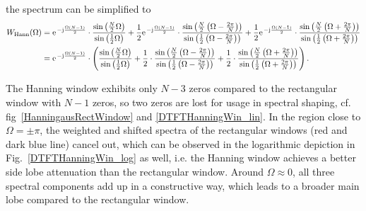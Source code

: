 \documentclass[11pt,a4paper,DIV=12]{scrartcl}
\begin{document}
%
the spectrum can be simplified to
%
\begin{align}
W_{\text{Hann}}(\Omega)&=\e^{-\im\frac{\Omega(N-1)}{2}}\cdot\frac{\sin\left(\frac{N}{2}\Omega\right)}{\sin\left(\frac{1}{2}\Omega\right)}+\frac{1}{2}\e^{-\im\frac{\Omega(N-1)}{2}}\cdot\frac{\sin\left(\frac{N}{2}\left(\Omega-\frac{2\pi}{N}\right)\right)}{\sin\left(\frac{1}{2}\left(\Omega-\frac{2\pi}{N}\right)\right)}+\frac{1}{2}\e^{-\im\frac{\Omega(N-1)}{2}}\cdot\frac{\sin\left(\frac{N}{2}\left(\Omega+\frac{2\pi}{N}\right)\right)}{\sin\left(\frac{1}{2}\left(\Omega+\frac{2\pi}{N}\right)\right)}\\
&=\e^{-\im\frac{\Omega(N-1)}{2}}\cdot\left(\frac{\sin\left(\frac{N}{2}\Omega\right)}{\sin\left(\frac{1}{2}\Omega\right)}+\frac{1}{2}\cdot\frac{\sin\left(\frac{N}{2}\left(\Omega-\frac{2\pi}{N}\right)\right)}{\sin\left(\frac{1}{2}\left(\Omega-\frac{2\pi}{N}\right)\right)}+\frac{1}{2}\cdot\frac{\sin\left(\frac{N}{2}\left(\Omega+\frac{2\pi}{N}\right)\right)}{\sin\left(\frac{1}{2}\left(\Omega+\frac{2\pi}{N}\right)\right)}\right).
\end{align}

The Hanning window exhibits only $N-3$ zeros compared to the rectangular window
with $N-1$ zeros, so two zeros are lost for usage in spectral shaping,
cf. fig~\ref{HanningausRectWindow} and \ref{DTFTHanningWin_lin}.
%
In the region close to $\Omega=\pm\pi$, the weighted and shifted spectra of
the rectangular windows (red and dark blue line) cancel out, which can be
observed in the logarithmic depiction in Fig.~\ref{DTFTHanningWin_log} as well,
i.e. the Hanning window achieves a better side lobe attenuation than the
rectangular window.
%
Around $\Omega\approx 0$, all three spectral components add up in a constructive
way, which leads to a broader main lobe compared to the rectangular window.
\end{document}
